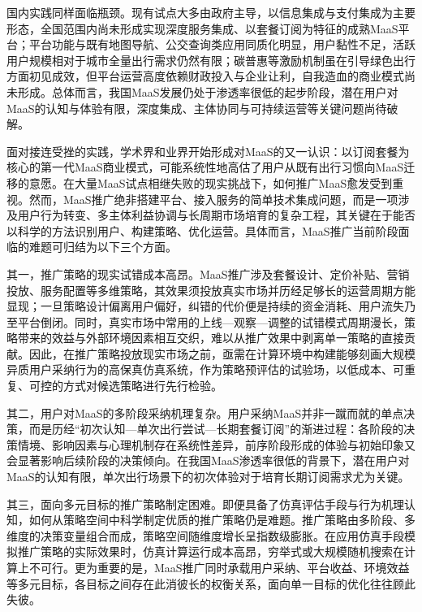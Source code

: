 国内实践同样面临瓶颈。现有试点大多由政府主导，以信息集成与支付集成为主要形态，全国范围内尚未形成实现深度服务集成、以套餐订阅为特征的成熟MaaS平台；平台功能与既有地图导航、公交查询类应用同质化明显，用户黏性不足，活跃用户规模相对于城市全量出行需求仍然有限；碳普惠等激励机制虽在引导绿色出行方面初见成效，但平台运营高度依赖财政投入与企业让利，自我造血的商业模式尚未形成。总体而言，我国MaaS发展仍处于渗透率很低的起步阶段，潜在用户对MaaS的认知与体验有限，深度集成、主体协同与可持续运营等关键问题尚待破解。

面对接连受挫的实践，学术界和业界开始形成对MaaS的又一认识：以订阅套餐为核心的第一代MaaS商业模式，可能系统性地高估了用户从既有出行习惯向MaaS迁移的意愿\cite{hensherMobilityFeatureMaaF2023,enochMaaSMobilityService2023}。在大量MaaS试点相继失败的现实挑战下，如何推广MaaS愈发受到重视。然而，MaaS推广绝非搭建平台、接入服务的简单技术集成问题，而是一项涉及用户行为转变、多主体利益协调与长周期市场培育的复杂工程，其关键在于能否以科学的方法识别用户、构建策略、优化运营。具体而言，MaaS推广当前阶段面临的难题可归结为以下三个方面。

其一，推广策略的现实试错成本高昂。MaaS推广涉及套餐设计、定价补贴、营销投放、服务配置等多维策略，其效果须投放真实市场并历经足够长的运营周期方能显现；一旦策略设计偏离用户偏好，纠错的代价便是持续的资金消耗、用户流失乃至平台倒闭。同时，真实市场中常用的上线—观察—调整的试错模式周期漫长，策略带来的效益与外部环境因素相互交织，难以从推广效果中剥离单一策略的直接贡献。因此，在推广策略投放现实市场之前，亟需在计算环境中构建能够刻画大规模异质用户采纳行为的高保真仿真系统，作为策略预评估的试验场，以低成本、可重复、可控的方式对候选策略进行先行检验。

其二，用户对MaaS的多阶段采纳机理复杂。用户采纳MaaS并非一蹴而就的单点决策，而是历经``初次认知—单次出行尝试—长期套餐订阅''的渐进过程：各阶段的决策情境、影响因素与心理机制存在系统性差异，前序阶段形成的体验与初始印象又会显著影响后续阶段的决策倾向。在我国MaaS渗透率很低的背景下，潜在用户对MaaS的认知有限，单次出行场景下的初次体验对于培育长期订阅需求尤为关键。

其三，面向多元目标的推广策略制定困难。即便具备了仿真评估手段与行为机理认知，如何从策略空间中科学制定优质的推广策略仍是难题。推广策略由多阶段、多维度的决策变量组合而成，策略空间随维度增长呈指数级膨胀。在应用仿真手段模拟推广策略的实际效果时，仿真计算运行成本高昂，穷举式或大规模随机搜索在计算上不可行。更为重要的是，MaaS推广同时承载用户采纳、平台收益、环境效益等多元目标，各目标之间存在此消彼长的权衡关系，面向单一目标的优化往往顾此失彼。

